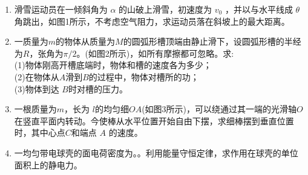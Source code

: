 \begin{enumerate}
\item 滑雪运动员在一倾斜角为 $\alpha$ 的山破上滑雪，初速度为 $v_0$ ，并以与水平线成 $\theta$ 角跳出，如图1所示，不考虑空气阻力，求运动员落在斜坡上的最大距离。
\item 一质量为$m$的物体从质量为$M$的圆弧形槽顶端由静止滑下，设圆弧形槽的半经为$R$，张角为$\pi /2$。(如图2所示)，如所有摩擦都可忽略。求:\\
(1)物体刚高开槽底端时，物体和槽的速度各为多少；\\
(2)在物体从$A$滑到$B$的过程中，物体对槽所的功；\\
(3)物体到达 $B $时对槽的压力。
\item 一根质量为$m$，长为  $l$的均匀细$OA$(如图3所示)，可以绕通过其一端的光滑轴$O$在竖直平面内转动。今使棒从水平位置开始自由下摆，求细棒摆到垂直位置时，其中心点$C$和端点 $A$ 的速度。
\item 一均匀带电球壳的面电荷密度为。。利用能量守恒定律，求作用在球壳的单位面积上的静电力。
\end{enumerate}
